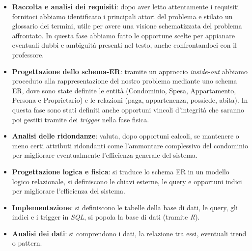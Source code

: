 \begin{itemize}
    \item \textbf{Raccolta e analisi dei requisiti}: dopo aver letto attentamente i requisiti fornitoci abbiamo identificato i principali attori del problema e stilato un glossario dei termini, utile per avere una visione schematizzata del problema affrontato. In questa fase abbiamo fatto le opportune scelte per appianare eventuali dubbi e ambiguità presenti nel testo, anche confrontandoci con il professore.
    \item \textbf{Progettazione dello schema-ER}: tramite un approccio \textit{inside-out} abbiamo proceduto alla rappresentazione del nostro problema mediante uno schema ER, dove sono state definite le entità (Condominio, Spesa, Appartamento, Persona e Proprietario) e le relazioni (paga, appartenenza, possiede, abita). In questa fase sono stati definiti anche opportuni vincoli d'integrità che saranno poi gestiti tramite dei \textit{trigger} nella fase fisica.
    \item \textbf{Analisi delle ridondanze}: valuta, dopo opportuni calcoli, se mantenere o meno certi attributi ridondanti come l'ammontare complessivo del condominio per migliorare eventualmente l'efficienza generale del sistema.
    \item \textbf{Progettazione logica e fisica}: si traduce lo schema ER in un modello logico relazionale, si definiscono le chiavi esterne, le query e opportuni indici per migliorare l'efficienza del sistema.
    \item \textbf{Implementazione}: si definiscono le tabelle della base di dati, le query, gli indici e i trigger in \textit{SQL}, si popola la base di dati (tramite \textit{R}).
    \item \textbf{Analisi dei dati}: si comprendono i dati, la relazione tra essi, eventuali trend o pattern.
\end{itemize}

